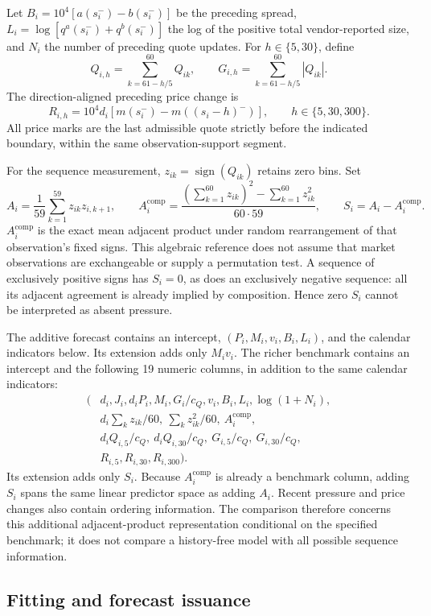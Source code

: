 \documentclass[12pt,letterpaper]{article}
\begin{document}
Let $B_i=10^4[a(s_i^-)-b(s_i^-)]$ be the preceding spread, $L_i=\log[q^a(s_i^-)+q^b(s_i^-)]$ the log of the positive total vendor-reported size, and $N_i$ the number of preceding quote updates. For $h\in\{5,30\}$, define
\[
 Q_{i,h}=\sum_{k=61-h/5}^{60}Q_{ik},\qquad
 G_{i,h}=\sum_{k=61-h/5}^{60}|Q_{ik}|.
\]
The direction-aligned preceding price change is
\[
 R_{i,h}=10^4d_i[m(s_i^-)-m((s_i-h)^-)],
 \qquad h\in\{5,30,300\}.
\]
All price marks are the last admissible quote strictly before the indicated boundary, within the same observation-support segment.

For the sequence measurement, $z_{ik}=\operatorname{sign}(Q_{ik})$ retains zero bins. Set
\[
 A_i=\frac{1}{59}\sum_{k=1}^{59}z_{ik}z_{i,k+1},\qquad
 A_i^{\mathrm{comp}}=
 \frac{(\sum_{k=1}^{60}z_{ik})^2-\sum_{k=1}^{60}z_{ik}^2}{60\cdot59},
 \qquad S_i=A_i-A_i^{\mathrm{comp}}.
\]
$A_i^{\mathrm{comp}}$ is the exact mean adjacent product under random rearrangement of that observation's fixed signs. This algebraic reference does not assume that market observations are exchangeable or supply a permutation test. A sequence of exclusively positive signs has $S_i=0$, as does an exclusively negative sequence: all its adjacent agreement is already implied by composition. Hence zero $S_i$ cannot be interpreted as absent pressure.

The additive forecast contains an intercept, $(P_i,M_i,v_i,B_i,L_i)$, and the calendar indicators below. Its extension adds only $M_iv_i$. The richer benchmark contains an intercept and the following 19 numeric columns, in addition to the same calendar indicators:
\begin{align*}
(&d_i,J_i,d_iP_i,M_i,G_i/c_Q,v_i,B_i,L_i,\log(1+N_i),\\
 &d_i\textstyle\sum_k z_{ik}/60,\ \textstyle\sum_k z_{ik}^2/60,\ A_i^{\mathrm{comp}},\\
 &d_iQ_{i,5}/c_Q,\ d_iQ_{i,30}/c_Q,\ G_{i,5}/c_Q,\ G_{i,30}/c_Q,\\
 &R_{i,5},R_{i,30},R_{i,300}).
\end{align*}
Its extension adds only $S_i$. Because $A_i^{\mathrm{comp}}$ is already a benchmark column, adding $S_i$ spans the same linear predictor space as adding $A_i$. Recent pressure and price changes also contain ordering information. The comparison therefore concerns this additional adjacent-product representation conditional on the specified benchmark; it does not compare a history-free model with all possible sequence information.

\subsection{Fitting and forecast issuance}
\label{app:fitting}
\end{document}
